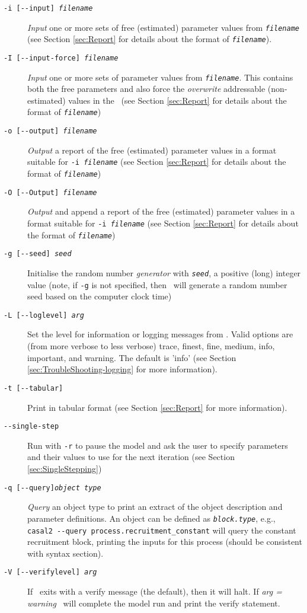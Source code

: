\begin{description}
\item [\texttt{-i [-{}-input] \emph{filename}}] \emph{Input} one or more sets of free (estimated) parameter values from \texttt{\emph{filename}} (see Section \ref{sec:Report} for details about the format of \texttt{\emph{filename}}).
\item [\texttt{-I [-{}-input-force] \emph{filename}}] \emph{Input} one or more sets of parameter values from \texttt{\emph{filename}}. This contains both the free parameters and also force the \emph{overwrite} addressable (non-estimated) values in the \config\ (see Section \ref{sec:Report} for details about the format of \texttt{\emph{filename}})
\item [\texttt{-o [-{}-output] \emph{filename}}] \emph{Output} a report of the free (estimated) parameter values in a format suitable for \texttt{-i \emph{filename}} (see Section \ref{sec:Report} for details about the format of \texttt{\emph{filename}})
\item [\texttt{-O [-{}-Output] \emph{filename}}] \emph{Output} and append a report of the free (estimated) parameter values in a format suitable for \texttt{-i \emph{filename}} (see Section \ref{sec:Report} for details about the format of \texttt{\emph{filename}})
\item [\texttt{-g [-{}-seed] \emph{seed}}] Initialise the random number \emph{generator} with \texttt{\emph{seed}}, a positive (long) integer value (note, if \texttt{-g} is not specified, then \CNAME\ will  generate a random number seed based on the computer clock time)
\item [\texttt{-L [-{}-loglevel] \emph{arg}}] Set the level for information or logging messages from \CNAME. Valid options are (from more verbose to less verbose) trace, finest, fine, medium, info, important, and warning. The default is 'info' (see Section \ref{sec:TroubleShooting-logging} for more information).
\item [\texttt{-t [-{}-tabular]}] Print  in tabular format (see Section \ref{sec:Report} for more information).
\item [\texttt{-{}-single-step}] Run with \texttt{-r} to pause the model and ask the user to specify parameters and their values to use for the next iteration (see Section \ref{sec:SingleStepping})
\item [\texttt{-q [-{}-query]\emph{object type}}] \emph{Query} an object type to print an extract of the object description and parameter definitions.  An object can be defined as \texttt{\emph{block.type}}, e.g., \texttt{casal2 -{}-query process.recruitment\_constant} will query the constant recruitment block, printing the inputs for this process (should be consistent with syntax section).
\item [\texttt{-V [-{}-verifylevel] \emph{arg}}] If \CNAME\ exits with a verify message (the default), then it will halt. If \emph{arg = warning} \CNAME\ will complete the model run and print the verify statement.
\end{description}
